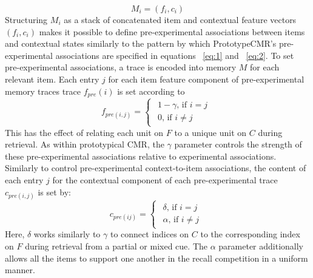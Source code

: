 {}\begin{equation} \label{eq:16} M_i = (f_i, c_i) \end{equation}\markdownRendererInterblockSeparator
{}\markdownRendererInterblockSeparator
{}Structuring $M_i$ as a stack of concatenated item and contextual feature vectors $(f_i, c_i)$ makes it possible to define pre-experimental associations between items and contextual states similarly to the pattern by which PrototypeCMR's pre-experimental associations are specified in equations ~\ref{eq:1} and ~\ref{eq:2}. To set pre-experimental associations, a trace is encoded into memory $M$ for each relevant item. Each entry $j$ for each item feature component of pre-experimental memory traces trace $f_{pre}(i)$ is set according to\markdownRendererInterblockSeparator
{}\begin{equation} \label{eq:17} f_{pre(i, j)} = \begin{cases} \begin{alignedat}{2} 1 - \gamma \text{, if } i=j \\ 0 \text{, if } i \neq j \end{alignedat} \end{cases} \end{equation}\markdownRendererInterblockSeparator
{}This has the effect of relating each unit on $F$ to a unique unit on $C$ during retrieval. As within prototypical CMR, the $\gamma$ parameter controls the strength of these pre-experimental associations relative to experimental associations.\markdownRendererInterblockSeparator
{}Similarly to control pre-experimental context-to-item associations, the content of each entry $j$ for the contextual component of each pre-experimental trace $c_{pre(i,j)}$ is set by:\markdownRendererInterblockSeparator
{}\begin{equation} \label{eq:18} c_{pre(ij)} = \begin{cases} \begin{alignedat}{2} \delta \text{, if } i=j \\ \alpha \text{, if } i \neq j \end{alignedat} \end{cases} \end{equation}\markdownRendererInterblockSeparator
{}Here, $\delta$ works similarly to $\gamma$ to connect indices on $C$ to the corresponding index on $F$ during retrieval from a partial or mixed cue. The $\alpha$ parameter additionally allows all the items to support one another in the recall competition in a uniform manner.\markdownRendererInterblockSeparator
